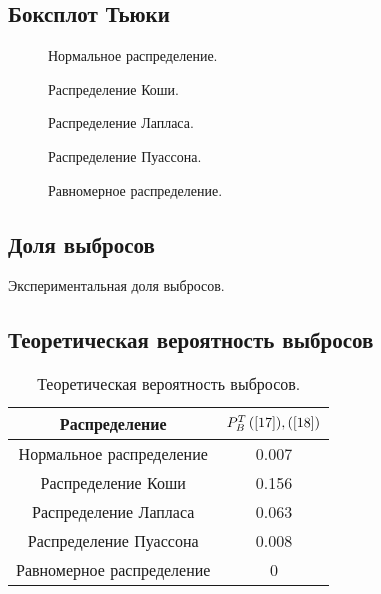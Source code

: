 \subsection{Боксплот Тьюки}
\begin{figure}[H]
	\caption{ Нормальное распределение.}
	\label{ris:6}
\end{figure}
\begin{figure}[H]
	\caption{ Распределение Коши.}
	\label{ris:7}
\end{figure}
\begin{figure}[H]
	\caption{ Распределение Лапласа.}
	\label{ris:8}
\end{figure}
\begin{figure}[H]
	\caption{ Распределение Пуассона.}
	\label{ris:9}
\end{figure}
\begin{figure}[H]
	\caption{ Равномерное распределение.}
	\label{ris:10}
\end{figure}

\subsection{Доля выбросов}
\begin{table}[H]
	\begin{center}
		
	\end{center}
	\caption{\label{tab:7} Экспериментальная доля выбросов.}
\end{table}

\subsection{Теоретическая вероятность выбросов}
\begin{table}[H]
	\begin{center}
		\begin{tabular}{|c|c|}
			\hline
			Распределение & $P_B^T \,(\ref{17}),(\ref{18})$ \\
			\hline
			Нормальное распределение & 0.007\\
			\hline
			Распределение Коши  & 0.156\\
			\hline
			Распределение Лапласа & 0.063\\
			\hline
			Распределение Пуассона & 0.008\\
			\hline
			Равномерное распределение & 0\\
			\hline
		\end{tabular}
	\end{center}
	\caption{\label{tab:8} Теоретическая вероятность выбросов.}
\end{table}

